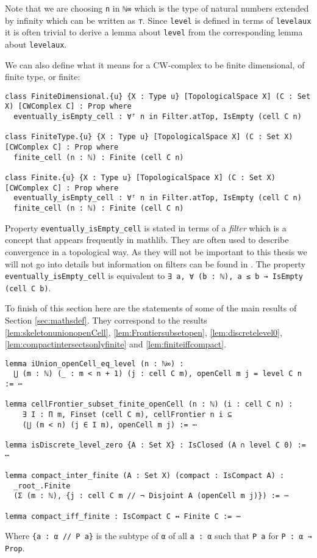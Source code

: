 Note that we are choosing \lstinline{n} in \lstinline{ℕ∞} which is the type of natural numbers extended by infinity which can be written as \lstinline{⊤}.
Since \lstinline{level} is defined in terms of \lstinline{levelaux} it is often trivial to derive a lemma about \lstinline{level} from the corresponding lemma about \lstinline{levelaux}.

We can also define what it means for a CW-complex to be finite dimensional, of finite type, or finite:

\begin{lstlisting}
class FiniteDimensional.{u} {X : Type u} [TopologicalSpace X] (C : Set X) [CWComplex C] : Prop where
  eventually_isEmpty_cell : ∀ᶠ n in Filter.atTop, IsEmpty (cell C n)

class FiniteType.{u} {X : Type u} [TopologicalSpace X] (C : Set X) [CWComplex C] : Prop where
  finite_cell (n : ℕ) : Finite (cell C n)

class Finite.{u} {X : Type u} [TopologicalSpace X] (C : Set X) [CWComplex C] : Prop where
  eventually_isEmpty_cell : ∀ᶠ n in Filter.atTop, IsEmpty (cell C n)
  finite_cell (n : ℕ) : Finite (cell C n)
\end{lstlisting}

Property \lstinline{eventually_isEmpty_cell} is stated in terms of a \emph{filter} which is a concept that appears frequently in mathlib.
They are often used to describe convergence in a topological way.
As they will not be important to this thesis we will not go into details but information on filters can be found in \cite{Bourbaki1966}.
The property \lstinline{eventually_isEmpty_cell} is equivalent to \lstinline{∃ a, ∀ (b : ℕ), a ≤ b → IsEmpty (cell C b)}.

To finish of this section here are the statements of some of the main results of Section \ref{sec:mathsdef}.
They correspond to the results \ref{lem:skeletonunionopenCell}, \ref{lem:Frontiersubsetopen}, \ref{lem:discretelevel0}, \ref{lem:compactintersectsonlyfinite} and \ref{lem:finiteiffcompact}.

\begin{lstlisting}
lemma iUnion_openCell_eq_level (n : ℕ∞) :
  ⋃ (m : ℕ) (_ : m < n + 1) (j : cell C m), openCell m j = level C n := ⋯

lemma cellFrontier_subset_finite_openCell (n : ℕ) (i : cell C n) :
    ∃ I : Π m, Finset (cell C m), cellFrontier n i ⊆
    (⋃ (m < n) (j ∈ I m), openCell m j) := ⋯

lemma isDiscrete_level_zero {A : Set X} : IsClosed (A ∩ level C 0) := ⋯

lemma compact_inter_finite (A : Set X) (compact : IsCompact A) :
  _root_.Finite
  (Σ (m : ℕ), {j : cell C m // ¬ Disjoint A (openCell m j)}) := ⋯

lemma compact_iff_finite : IsCompact C ↔ Finite C := ⋯
\end{lstlisting}

Where \lstinline|{a : α // P a}| is the subtype of \lstinline{α} of all \lstinline{a : α} such that \lstinline{P a} for \lstinline{P : α → Prop}.
